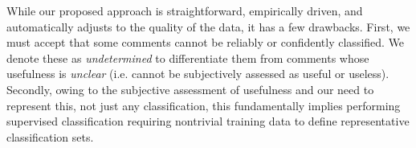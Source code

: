 While our proposed approach is straightforward, empirically driven, and automatically adjusts to the quality of the data, it has a few drawbacks.
First, we must accept that some comments cannot be reliably or confidently classified.
We denote these as \emph{undetermined} to differentiate them from comments whose usefulness is \emph{unclear} (i.e. cannot be subjectively assessed as useful or useless).
Secondly, owing to the subjective assessment of usefulness and our need to represent this, not just any classification, this fundamentally implies performing supervised classification requiring nontrivial training data to define representative classification sets.










